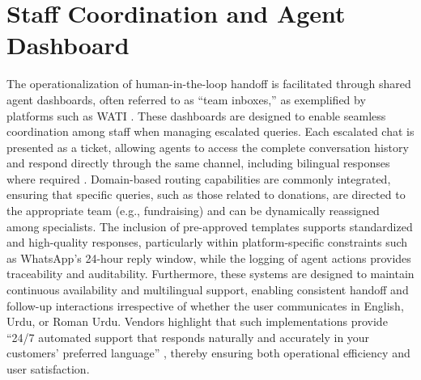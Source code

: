 \section{Staff Coordination and Agent Dashboard}
The operationalization of human-in-the-loop handoff is facilitated through shared agent dashboards, often referred to as “team inboxes,” as exemplified by platforms such as WATI \cite{wati2024aisupport}. These dashboards are designed to enable seamless coordination among staff when managing escalated queries. Each escalated chat is presented as a ticket, allowing agents to access the complete conversation history and respond directly through the same channel, including bilingual responses where required \cite{wati2024aisupport}. Domain-based routing capabilities are commonly integrated, ensuring that specific queries, such as those related to donations, are directed to the appropriate team (e.g., fundraising) and can be dynamically reassigned among specialists. The inclusion of pre-approved templates supports standardized and high-quality responses, particularly within platform-specific constraints such as WhatsApp’s 24-hour reply window, while the logging of agent actions provides traceability and auditability. Furthermore, these systems are designed to maintain continuous availability and multilingual support, enabling consistent handoff and follow-up interactions irrespective of whether the user communicates in English, Urdu, or Roman Urdu. Vendors highlight that such implementations provide “24/7 automated support that responds naturally and accurately in your customers’ preferred language” \cite{wati2024aisupport}, thereby ensuring both operational efficiency and user satisfaction.

